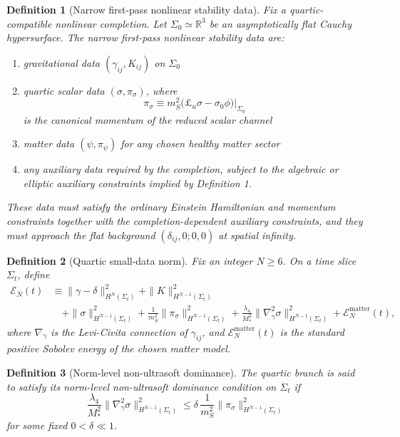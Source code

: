 \documentclass[11pt]{article}
\newtheorem{definition}{Definition}
\begin{document}
\begin{definition}[Narrow first-pass nonlinear stability data]
Fix a quartic-compatible nonlinear completion. Let \(\Sigma_0\simeq \mathbb R^3\) be an asymptotically flat Cauchy hypersurface. The \emph{narrow first-pass nonlinear stability data} are:
\begin{enumerate}
    \item gravitational data \((\gamma_{ij},K_{ij})\) on \(\Sigma_0\)
    \item quartic scalar data \((\sigma,\pi_\sigma)\), where
    \begin{equation}
    \pi_\sigma
    \equiv
    m_S^2\bigl(\pounds_u \sigma-\sigma_0\phi\bigr)\Big|_{\Sigma_0}
    \label{eq:pisigma}
    \end{equation}
    is the canonical momentum of the reduced scalar channel
    \item matter data \((\psi,\pi_\psi)\) for any chosen healthy matter sector
    \item any auxiliary data required by the completion, subject to the algebraic or elliptic auxiliary constraints implied by Definition 1.
\end{enumerate}
These data must satisfy the ordinary Einstein Hamiltonian and momentum constraints together with the completion-dependent auxiliary constraints, and they must approach the flat background \((\delta_{ij},0;0,0)\) at spatial infinity.
\end{definition}

\begin{definition}[Quartic small-data norm]
Fix an integer \(N\ge 6\). On a time slice \(\Sigma_t\), define
\begin{align}
\mathcal E_N(t)
&\equiv
\|\gamma-\delta\|_{H^N(\Sigma_t)}^2
+ \|K\|_{H^{N-1}(\Sigma_t)}^2
\nonumber\\
&\quad
+ \|\sigma\|_{H^{N-1}(\Sigma_t)}^2
+ \frac{1}{m_S^2}\|\pi_\sigma\|_{H^{N-1}(\Sigma_t)}^2
+ \frac{\lambda_4}{M_*^2}\|\nabla_\gamma^2 \sigma\|_{H^{N-1}(\Sigma_t)}^2
+ \mathcal E_N^{\mathrm{matter}}(t),
\label{eq:EN}
\end{align}
where \(\nabla_\gamma\) is the Levi-Civita connection of \(\gamma_{ij}\), and \(\mathcal E_N^{\mathrm{matter}}(t)\) is the standard positive Sobolev energy of the chosen matter model.
\end{definition}

\begin{definition}[Norm-level non-ultrasoft dominance]
The quartic branch is said to satisfy its \emph{norm-level non-ultrasoft dominance condition} on \(\Sigma_t\) if
\begin{equation*}
\frac{\lambda_4}{M_*^2}\|\nabla_\gamma^2 \sigma\|_{H^{N-1}(\Sigma_t)}^2
\le
\delta\,
\frac{1}{m_S^2}\|\pi_\sigma\|_{H^{N-1}(\Sigma_t)}^2
\tag{\theequation}
\label{eq:normepsilon}
\end{equation*}
for some fixed \(0<\delta\ll 1\).
\end{definition}
\end{document}
